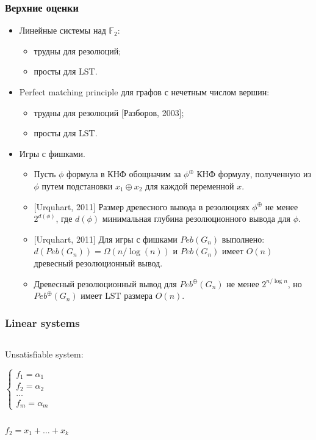\begin{frame}
    \frametitle{Верхние оценки}

    \begin{itemize}
		\item Линейные системы над $\mathbb{F}_2$:
			\begin{itemize}
				\item трудны для резолюций;
				\item просты для LST.
			\end{itemize}
        \pause
		\item Perfect matching principle для графов с нечетным числом вершин:
		    \begin{itemize}
        		\item трудны для резолюций [Разборов, 2003];
				\item просты для LST.
			\end{itemize}
        \pause
		\item Игры с фишками.
			\begin{itemize}
				\item Пусть $\phi$ формула в КНФ обощначим за $\phi^{\oplus}$ КНФ формулу, полученную из $\phi$ путем подстановки
		            $x_1 \oplus x_2$ для каждой переменной $x$. 
				\item{} [Urquhart, 2011] Размер древесного вывода в резолюциях $\phi^{\oplus}$ не менее $2^{d(\phi)}$, где
		            $d(\phi)$ минимальная глубина резолюционного вывода для  $\phi$.
				\item{} [Urquhart, 2011] Для игры с фишками $Peb(G_n)$ выполнено: $d(Peb(G_n)) = \Omega(n / \log(n))$ и $Peb(G_n)$
		            имеет $O(n)$ древесный резолюционный вывод.
				\item Древесный резолюционный вывод для $Peb^\oplus(G_n)$ не менее $2^{n / \log n}$, но $Peb^\oplus(G_n)$ имеет
		            LST размера $O(n)$. 
			\end{itemize}
	\end{itemize}
\end{frame}




\begin{frame}
    \frametitle{Linear systems}

    \begin{columns}
		\begin{column}{1cm}
			Unsatisfiable system:

			$\left\{ \begin{aligned}
				f_1 = \alpha_1 \\
				f_2 = \alpha_2 \\
				\dots\\
				f_m = \alpha_m
			\end{aligned}\right.$
		\end{column}


		\begin{column}{9cm}
			
		\end{column}
	\end{columns}

	$f_2 = x_1 + \dots + x_k$
\end{frame}

